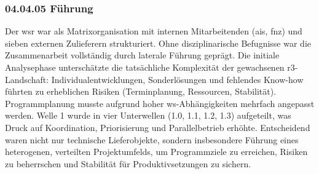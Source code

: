 \subsubsection*{04.04.05 Führung}
{}
\label{sec:04.04.05_Fuehrung}


\par Der \gls{wsr} war als Matrixorganisation mit internen Mitarbeitenden (\gls{ais}, \gls{fnz}) und sieben externen Zulieferern strukturiert. Ohne disziplinarische Befugnisse war die Zusammenarbeit vollständig durch laterale Führung geprägt. Die initiale Analysephase unterschätzte die tatsächliche Komplexität der gewachsenen \gls{r3}-Landschaft: Individualentwicklungen, Sonderlösungen und fehlendes Know-how führten zu erheblichen Risiken (Terminplanung, Ressourcen, Stabilität). Programmplanung musste aufgrund hoher \gls{ws}-Abhängigkeiten mehrfach angepasst werden. Welle 1 wurde in vier Unterwellen (1.0, 1.1, 1.2, 1.3) aufgeteilt, was Druck auf Koordination, Priorisierung und Parallelbetrieb erhöhte. Entscheidend waren nicht nur technische Lieferobjekte, sondern insbesondere Führung eines heterogenen, verteilten Projektumfelds, um Programmziele zu erreichen, Risiken zu beherrschen und Stabilität für Produktivsetzungen zu sichern.



